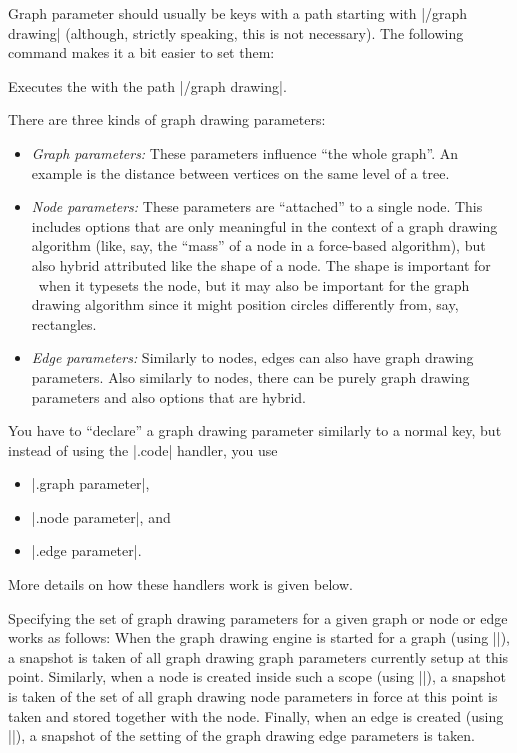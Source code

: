 Graph parameter should usually be keys with a path starting with
|/graph drawing| (although, strictly speaking, this is not
necessary). The following command makes it a bit easier to set them:
\begin{command}{\pgfgdset{}}
  Executes the  with the path |/graph drawing|.  
\end{command}

There are three kinds of graph drawing parameters:

\begin{itemize}
\item \emph{Graph parameters:}
  These parameters influence ``the whole graph''. An example
  is the distance between vertices on the same level of a tree.
\item \emph{Node parameters:}
  These parameters are ``attached'' to a single node. This includes
  options that are only meaningful in the context of a graph
  drawing algorithm (like, say, the ``mass'' of a node in a
  force-based algorithm), but also hybrid attributed like the shape
  of a node. The shape is important for \pgfname\ when it typesets the 
  node, but it may also be important for the graph drawing
  algorithm since it might position circles differently from, say,
  rectangles.
\item \emph{Edge parameters:}
  Similarly to nodes, edges can also have graph drawing
  parameters. Also similarly to nodes, there can be purely
  graph drawing parameters and also options that are hybrid.
\end{itemize}
   
You have to ``declare'' a graph drawing parameter similarly to a
normal key, but instead of using the |.code| handler, you use
\begin{itemize}
\item |.graph parameter|,
\item |.node parameter|, and
\item |.edge parameter|.
\end{itemize}
More details on how these handlers work is given below.

Specifying the set of graph drawing parameters for a given graph or
node or edge works as follows: When the graph drawing engine is
started for a graph (using |\pgfgdbeginscope|), a snapshot is taken of
all graph drawing graph parameters currently setup at this
point. Similarly, when a node is created inside such a scope (using
|\pgfnode|), a snapshot is taken of the set of all graph drawing node
parameters in force at this point is taken and stored together with
the node. Finally, when an edge is created (using |\pgfgdedge|), a
snapshot of the setting of the graph drawing edge parameters is
taken. 

